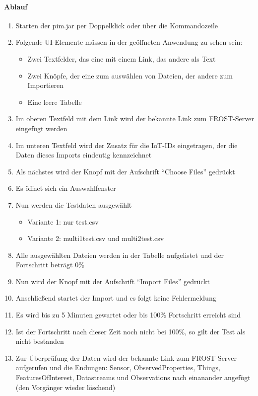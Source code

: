 \paragraph{Ablauf}
\begin{enumerate}
\item Starten der pim.jar per Doppelklick oder über die Kommandozeile
\item Folgende UI-Elemente m\"ussen in der ge\"offneten Anwendung zu sehen sein:
\begin{itemize}
\item Zwei Textfelder, das eine mit einem Link, das andere als Text
\item Zwei Kn\"opfe, der eine zum ausw\"ahlen von Dateien, der andere zum Importieren
\item Eine leere Tabelle
\end{itemize}
\item Im oberen Textfeld mit dem Link wird der bekannte Link zum FROST-Server eingefügt werden
\item Im unteren Textfeld wird der Zusatz f\"ur die IoT-IDs eingetragen, der die Daten dieses Imports eindeutig kennzeichnet
\item Als n\"achstes wird der Knopf mit der Aufschrift ``Choose Files'' gedrückt
\item Es \"offnet sich ein Auswahlfenster
\item Nun werden die Testdaten ausgew\"ahlt
\begin{itemize}
\item Variante 1: nur test.csv
\item Variante 2: multi1test.csv und multi2test.csv
\end{itemize}
\item Alle ausgew\"ahlten Dateien werden in der Tabelle aufgelistet und der Fortschritt betr\"agt 0\%
\item Nun wird der Knopf mit der Aufschrift ``Import Files'' gedr\"uckt
\item Anschlie\ss end startet der Import und es folgt keine Fehlermeldung
\item Es wird bis zu 5 Minuten gewartet oder bis 100\% Fortschritt erreicht sind
\item Ist der Fortschritt nach dieser Zeit noch nicht bei 100\%, so gilt der Test als nicht bestanden
\item Zur \"Uberpr\"ufung der Daten wird der bekannte Link zum FROST-Server aufgerufen und die Endungen: Sensor, ObservedProperties, Things, FeaturesOfInterest, Datastreams und Observations nach einanander angefügt (den Vorgänger wieder löschend)

\end{enumerate}
